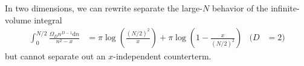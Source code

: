 In two dimensions, we can rewrite separate the large-$N$ behavior of the infinite-volume integral
\begin{align}
    \int_0^{N/2} \frac{\Omega_D n^{D-1} \mathrm{d}n}{n^2-x}
    &=
    \pi \log \left(\frac{(N/2)^2}{x}\right) + \pi \log\left(1-\frac{x}{(N/2)^2}\right)
    &
    (D&=2)
\end{align}
but cannot separate out an $x$-independent counterterm.
